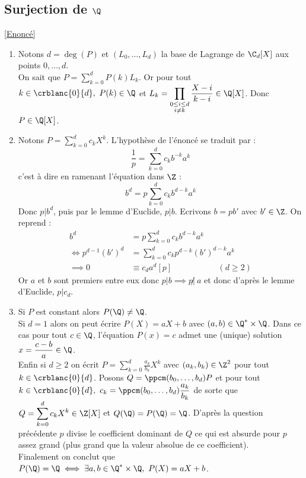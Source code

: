 \documentclass{book}
\begin{document}
	\subsection{Surjection de $\Q$}
	\label{Surjection de Q corrigé}
	\textcolor{blue}{\hyperref[Surjection de Q]{[Enoncé]}}\\
	\begin{enumerate}[leftmargin=*]
		\item Notons $d=\deg(P)$ et $(L_0,\dots,L_d)$ la base de Lagrange de $\C_d[X]$ aux points $0,\dots,d$.\\
		On sait que $P=\displaystyle\sum_{k=0}^dP(k)L_k$. Or pour tout $k\in \crblanc{0}{d},\ P(k)\in \Q$ et $L_k=\displaystyle\prod_{\substack{0\leq i\leq d\\i\ne k}}{\frac{X-i}{k-i}}\in \Q[X]$. Donc $P\in \Q[X]$.
		\item Notons $P=\displaystyle\sum_{k=0}^dc_kX^k$. L'hypothèse de l'énoncé se traduit par : $$\frac{1}{p}=\sum_{k=0}^dc_kb^{-k}a^k$$
		c'est à dire en ramenant l'équation dans $\Z$ :
		$$b^d=p\sum_{k=0}^d{c_kb^{d-k}a^k}$$
		Donc $p|b^d$, puis par le lemme d'Euclide, $p|b$. Ecrivons $b=pb'$ avec $b'\in \Z$. On reprend :
		\begin{align*}
			b^d&=p\sum_{k=0}^d{c_kb^{d-k}a^k}\\
			\iff p^{d-1}(b')^d&=\sum_{k=0}^d{c_kp^{d-k}(b')^{d-k}a^k}\\
			\implies 0&\equiv c_da^d [p]\ \ \ \ \ \ \ \ \ \ \ \ \ \ \ \ \ \ \ \ \ \ \ \ \ (d\geq 2)
		\end{align*}
		Or $a$ et $b$ sont premiers entre eux donc $p|b\implies p\not |\ a$ et donc d'après le lemme d'Euclide, $p|c_d$.
		\item Si $P$ est constant alors $P(\Q)\ne \Q$.\\
		Si $d=1$ alors on peut écrire $P(X)=aX+b$ avec $(a,b)\in \Q^*\times \Q$. Dans ce cas pour tout $c\in \Q$, l'équation $P(x)=c$ admet une (unique) solution $x=\displaystyle\frac{c-b}{a}\in \Q$.\\
		Enfin si $d\geq 2$ on écrit $P=\displaystyle\sum\limits_{k=0}^d{\displaystyle\frac{a_k}{b_k}X^k}$ avec $(a_k,b_k)\in \Z^2$ pour tout $k\in \crblanc{0}{d}$. Posons $Q=\ppcm(b_0,\dots,b_d)P$ et pour tout $k\in \crblanc{0}{d},\ c_k=\ppcm(b_0,\dots,b_d)\displaystyle\frac{a_k}{b_k}$ de sorte que $Q=\displaystyle\sum_{k=0}^d{c_kX^k}\in \Z[X]$ et $Q(\Q)=P(\Q)=\Q$.
		D'après la question précédente $p$ divise le coefficient dominant de $Q$ ce qui est absurde pour $p$ assez grand (plus grand que la valeur absolue de ce coefficient).\\
		Finalement on conclut que $P(\Q)=\Q \iff \exists a,b\in \Q^*\times \Q,\ P(X)=aX+b$.
	\end{enumerate}
	
\end{document}
